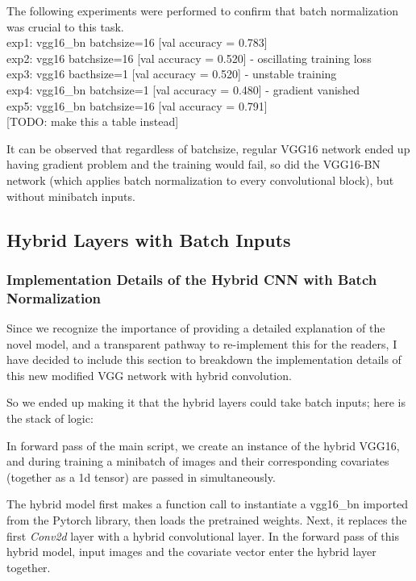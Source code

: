 \documentclass[12pt]{article}
\begin{document}
The following experiments were performed to confirm that batch normalization was crucial to this task. \\

\noindent exp1: vgg16\_bn batchsize=16 [val accuracy = 0.783]  \\
exp2: vgg16 batchsize=16 [val accuracy = 0.520] - oscillating training loss \\
exp3: vgg16 bacthsize=1 [val accuracy = 0.520] - unstable training \\
exp4: vgg16\_bn batchsize=1 [val accuracy = 0.480] - gradient vanished \\
exp5: vgg16\_bn batchsize=16 [val accuracy = 0.791] \\

[TODO: make this a table instead]

It can be observed that regardless of batchsize, regular VGG16 network ended up having gradient problem and the training would fail, so did the VGG16-BN network (which applies batch normalization to every convolutional block), but without minibatch inputs. 

\subsection{Hybrid Layers with Batch Inputs}

\subsubsection{Implementation Details of the Hybrid CNN with Batch Normalization}

Since we recognize the importance of providing a detailed explanation of the novel model, and a transparent pathway to re-implement this for the readers, I have decided to include this section to breakdown the implementation details of this new modified VGG network with hybrid convolution.

So we ended up making it that the hybrid layers could take batch inputs; here is the stack of logic:

In forward pass of the main script, we create an instance of the hybrid VGG16, and during training a minibatch of images and their corresponding covariates (together as a 1d tensor) are passed in simultaneously.

The hybrid model first makes a function call to instantiate a vgg16\_bn imported from the Pytorch library, then loads the pretrained weights. Next, it replaces the first \textit{Conv2d} layer with a hybrid convolutional layer. In the forward pass of this hybrid model, input images and the covariate vector enter the hybrid layer together.
\end{document}
